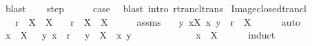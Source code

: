 \begin{isabellebody}
\ blast\isanewline
{}\isamarkupfalse%
\isanewline
\ \ \isamarkupfalse%
\ step\isanewline
\ \ \isamarkupfalse%
\ \isamarkupfalse%
\ {\isacharquery}{\kern0pt}case\ \isamarkupfalse%
\ {\isacharparenleft}{\kern0pt}blast\ intro{\isacharcolon}{\kern0pt}\ rtrancl{\isacharunderscore}{\kern0pt}trans{\isacharparenright}{\kern0pt}\isanewline
{}\isamarkupfalse%
%
\endisatagproof
{\isafoldproof}%
%
\isadelimproof
\isanewline
%
\endisadelimproof
\isanewline
{}\isamarkupfalse%
\ Image{\isacharunderscore}{\kern0pt}closed{\isacharunderscore}{\kern0pt}trancl{\isacharcolon}{\kern0pt}\isanewline
\ \ \ {\isachardoublequoteopen}r\ {\isacharbackquote}{\kern0pt}{\isacharbackquote}{\kern0pt}\ X\ {\isasymsubseteq}\ X{\isachardoublequoteclose}\isanewline
\ \ \ {\isachardoublequoteopen}r\isactrlsup {\isacharasterisk}{\kern0pt}\ {\isacharbackquote}{\kern0pt}{\isacharbackquote}{\kern0pt}\ X\ {\isacharequal}{\kern0pt}\ X{\isachardoublequoteclose}\isanewline
%
\isadelimproof
%
\endisadelimproof
%
\isatagproof
{}\isamarkupfalse%
\ {\isacharminus}{\kern0pt}\isanewline
\ \ \isamarkupfalse%
\ assms\ \isamarkupfalse%
\ {\isacharasterisk}{\kern0pt}{\isacharasterisk}{\kern0pt}{\isacharcolon}{\kern0pt}\ {\isachardoublequoteopen}{\isacharbraceleft}{\kern0pt}y{\isachardot}{\kern0pt}\ {\isasymexists}x{\isasymin}X{\isachardot}{\kern0pt}\ {\isacharparenleft}{\kern0pt}x{\isacharcomma}{\kern0pt}\ y{\isacharparenright}{\kern0pt}\ {\isasymin}\ r{\isacharbraceright}{\kern0pt}\ {\isasymsubseteq}\ X{\isachardoublequoteclose}\isanewline
\ \ \ \ \isamarkupfalse%
\ auto\isanewline
\ \ \isamarkupfalse%
\ {\isachardoublequoteopen}x\ {\isasymin}\ X{\isachardoublequoteclose}\ \ {}{\isacharcolon}{\kern0pt}\ {\isachardoublequoteopen}{\isacharparenleft}{\kern0pt}y{\isacharcomma}{\kern0pt}\ x{\isacharparenright}{\kern0pt}\ {\isasymin}\ r\isactrlsup {\isacharasterisk}{\kern0pt}{\isachardoublequoteclose}\ \ {}{\isacharcolon}{\kern0pt}\ {\isachardoublequoteopen}y\ {\isasymin}\ X{\isachardoublequoteclose}\ \ x\ y\isanewline
\ \ \isamarkupfalse%
\ {\isacharminus}{\kern0pt}\isanewline
\ \ \ \ \isamarkupfalse%
\ {}\ \isamarkupfalse%
\ {\isachardoublequoteopen}x\ {\isasymin}\ X{\isachardoublequoteclose}\isanewline
\ \ \ \ \isamarkupfalse%
\ induct\isanewline

\end{isabellebody}
